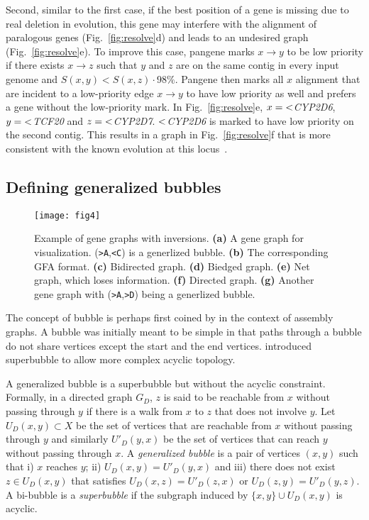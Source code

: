 \documentclass[webpdf,contemporary,large,namedate]{oup-authoring-template}%
\begin{document}
Second, similar to the first case, if the best position of a gene is missing due to real deletion in evolution,
this gene may interfere with the alignment of paralogous genes (Fig.~\ref{fig:resolve}d)
and leads to an undesired graph (Fig.~\ref{fig:resolve}e).
To improve this case, pangene marks $x\to y$ to be low priority
if there exists $x\to z$ such that $y$ and $z$ are on the same contig in every input genome and $S(x,y)<S(x,z)\cdot 98\%$.
Pangene then marks all $x$ alignment that are incident to a low-priority edge $x\to y$ to have low priority as well
and prefers a gene without the low-priority mark.
In Fig.~\ref{fig:resolve}e, $x={\rm <}$\emph{CYP2D6}, $y={\rm <}$\emph{TCF20} and $z={\rm <}$\emph{CYP2D7}.
${\rm <}$\emph{CYP2D6} is marked to have low priority on the second contig.
This results in a graph in Fig.~\ref{fig:resolve}f that is more consistent with the known evolution at this locus~\citep{Liao:2023aa}.

\subsection{Defining generalized bubbles}

\begin{figure}[t!]
\centering
\texttt{[image: fig4]}
\caption{Example of gene graphs with inversions.
{\bf (a)} A gene graph for visualization. ({\tt >A},{\tt <C}) is a generlized bubble.
{\bf (b)} The corresponding GFA format.
{\bf (c)} Bidirected graph.
{\bf (d)} Biedged graph.
{\bf (e)} Net graph, which loses information.
{\bf (f)} Directed graph.
{\bf (g)} Another gene graph with ({\tt >A},{\tt >D}) being a generlized bubble.
}\label{fig:inv}
\end{figure}

The concept of bubble is perhaps first coined by \citet{Zerbino:2008uq} in the context of assembly graphs.
A bubble was initially meant to be simple in that paths through a bubble do not share vertices except the start and the end vertices.
\citet{DBLP:conf/wabi/OnoderaSS13} introduced superbubble to allow more complex acyclic topology.

A generalized bubble is a superbubble but without the acyclic constraint.
Formally, in a directed graph $G_D$, $z$ is said to be reachable from $x$ without passing through $y$
if there is a walk from $x$ to $z$ that does not involve $y$.
Let $U_D(x,y)\subset X$ be the set of vertices that are reachable from $x$ without passing through $y$
and similarly $U'_D(y,x)$ be the set of vertices that can reach $y$ without passing through $x$.
A \emph{generalized bubble}  is a pair of vertices $(x,y)$ such that
i) $x$ reaches $y$; ii) $U_D(x,y)=U'_D(y,x)$ and iii) there does not exist $z\in U_D(x,y)$
that satisfies $U_D(x,z)=U'_D(z,x)$ or $U_D(z,y)=U'_D(y,z)$.
A bi-bubble is a \emph{superbubble} if the subgraph induced by $\{x,y\}\cup U_D(x,y)$ is acyclic.
\end{document}
